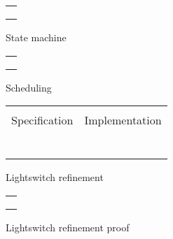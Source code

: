 
\begin{figure}
\centering
\begin{tabular}{c}
\hline \\
 \\ \\
\hline
\end{tabular}
\caption{State machine}
\label{fig:statemachine}
\end{figure}

\begin{figure}
\centering
\begin{tabular}{c}
\hline \\
 \\ \\
\hline
\end{tabular}
\caption{Scheduling}
\label{fig:scheduling}
\end{figure}

\begin{figure}
  \centering
  \begin{tabular}[c]{c|c}
    \hline \\
    Specification & Implementation \\
    \hline\hline \\ \\
    \begin{subfigure}[c]{0.5\textwidth}
     
      \label{fig:lightswitch1}
    \end{subfigure}
    &
    \begin{subfigure}[c]{0.5\textwidth}
      
      \label{fig:lightswicth2}
    \end{subfigure}
    \\ \\
    \hline
  \end{tabular}    
  \caption{Lightswitch refinement}
  \label{fig:lightswitch}
\end{figure}

\begin{figure}
\centering
\begin{tabular}{c}
\hline \\
 \\ \\
\hline
\end{tabular}
\caption{Lightswitch refinement proof}
\label{fig:lightswitch3}
\end{figure}

